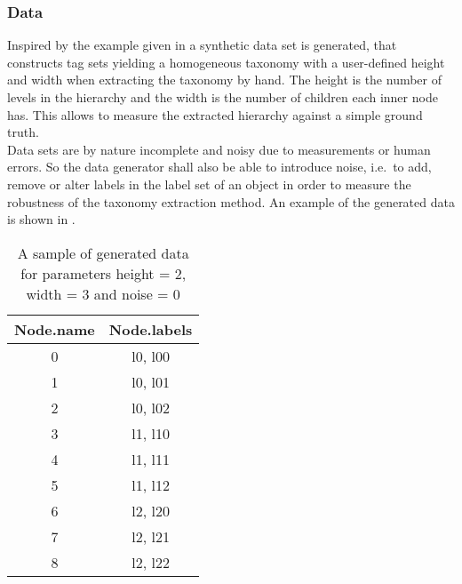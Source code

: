 \subsubsection{Data}\label{\positionnumber}
Inspired by the example given in  a synthetic data set is generated, that constructs tag sets yielding a homogeneous taxonomy with a user-defined height and width when extracting the taxonomy by hand. The height is the number of levels in the hierarchy and the width is the number of children each inner node has. This allows to measure the extracted hierarchy against a simple ground truth. \\
Data sets are by nature incomplete and noisy due to measurements or human errors.
So the data generator shall also be able to introduce noise, i.e.~to add, remove or alter labels in the label set of an object in order to measure the robustness of the taxonomy extraction method. 
An example of the generated data is shown in .
\begin{table}[htp]
     \centering
     \begin{tabular}{c c} \toprule
            Node.name & Node.labels \\ \midrule
            0 & l0, l00 \\ 
            1 & l0, l01 \\ 
            2 & l0, l02 \\ 
            3 & l1, l10 \\ 
            4 & l1, l11 \\ 
            5 & l1, l12 \\
            6 & l2, l20 \\ 
            7 & l2, l21 \\ 
            8 & l2, l22 \\ \bottomrule
        \end{tabular}
    \caption{A sample of generated data for parameters height = 2, width = 3 and noise = 0 }
    \label{tab:datagen}
\end{table}{}

